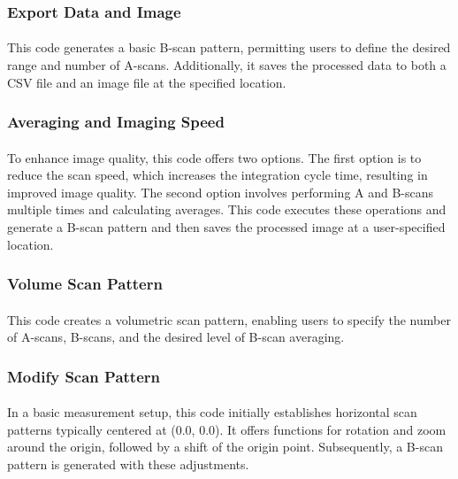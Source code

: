 \subsubsection{Export Data and Image}
\paragraph{}
This code generates a basic B-scan pattern, permitting users to define the desired range and number of A-scans. Additionally, it saves the processed data to both a CSV file and an image file at the specified location.

\subsubsection{Averaging and Imaging Speed}
\paragraph{}
To enhance image quality, this code offers two options. The first option is to reduce the scan speed, which increases the integration cycle time, resulting in improved image quality. The second option involves performing A and B-scans multiple times and calculating averages. This code executes these operations and generate a B-scan pattern and then saves the processed image at a user-specified location.

\subsubsection{Volume Scan Pattern}
\paragraph{}
This code creates a volumetric scan pattern, enabling users to specify the number of A-scans, B-scans, and the desired level of B-scan averaging.

\subsubsection{Modify Scan Pattern}
\paragraph{}
In a basic measurement setup, this code initially establishes horizontal scan patterns typically centered at (0.0, 0.0). It offers functions for rotation and zoom around the origin, followed by a shift of the origin point. Subsequently, a B-scan pattern is generated with these adjustments.

